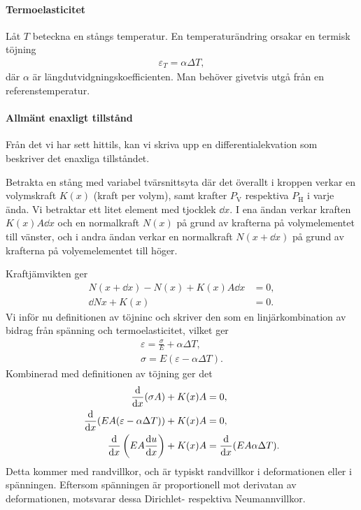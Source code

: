 \paragraph{Termoelasticitet}
Låt $T$ beteckna en stångs temperatur. En temperaturändring orsakar en termisk töjning
\begin{align*}
	\varepsilon_{T} = \alpha\Delta T,
\end{align*}
där $\alpha$ är längdutvidgningskoefficienten. Man behöver givetvis utgå från en referenstemperatur.

\paragraph{Allmänt enaxligt tillstånd}
Från det vi har sett hittils, kan vi skriva upp en differentialekvation som beskriver det enaxliga tillståndet.

Betrakta en stång med variabel tvärsnittsyta där det överallt i kroppen verkar en volymskraft $K(x)$ (kraft per volym), samt krafter $P_{\text{V}}$ respektiva $P_{\text{H}}$ i varje ända. Vi betraktar ett litet element med tjocklek $\dd{x}$. I ena ändan verkar kraften $K(x)A\dd{x}$ och en normalkraft $N(x)$ på grund av krafterna på volymelementet till vänster, och i andra ändan verkar en normalkraft $N(x + \dd{x})$ på grund av krafterna på volyemelementet till höger.

Kraftjämvikten ger
\begin{align*}
	N(x + \dd{x}) - N(x) + K(x)A\dd{x} &= 0, \\
	\dd{N}{x} + K(x)                   &= 0.
\end{align*}
Vi inför nu definitionen av töjninc och skriver den som en linjärkombination av bidrag från spänning och termoelasticitet, vilket ger
\begin{align*}
	\varepsilon = \frac{\sigma}{E} + \alpha\Delta T, \\
	\sigma = E(\varepsilon - \alpha\Delta T).
\end{align*}
Kombinerad med definitionen av töjning ger det
\begin{align*}
	\dv{x} (\sigma A) + K(x)A &= 0, \\
	\dv{x} (EA(\varepsilon - \alpha\Delta T)) + K(x)A &= 0, \\
	\dv{x}\left(EA\dv{u}{x}\right) + K(x)A &= \dv{x}(EA\alpha\Delta T).
\end{align*}
Detta kommer med randvillkor, och är typiskt randvillkor i deformationen eller i spänningen. Eftersom spänningen är proportionell mot derivatan av deformationen, motsvarar dessa Dirichlet- respektiva Neumannvillkor.